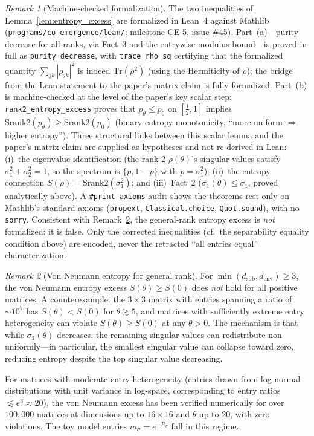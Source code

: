 \documentclass[12pt,a4paper]{article}
\theoremstyle{definition}
\theoremstyle{remark}
\newtheorem{remark}{Remark}
\begin{document}
\begin{remark}[Machine-checked formalization]
\label{rem:lean_entropy_excess}
The two inequalities of Lemma~\ref{lem:entropy_excess} are formalized in
Lean~4 against Mathlib (\texttt{programs/co-emergence/lean/}; milestone
CE-5, issue \#45). Part~(a)---purity decrease for all ranks, via Fact~3
and the entrywise modulus bound---is proved in full as
\texttt{purity\_decrease}, with \texttt{trace\_rho\_sq} certifying that
the formalized quantity $\sum_{jk}|\rho_{jk}|^2$ is indeed
$\mathrm{Tr}(\rho^2)$ (using the Hermiticity of $\rho$); the bridge from
the Lean statement to the paper's matrix claim is fully formalized.
Part~(b) is machine-checked at the level of the paper's key scalar step:
\texttt{rank2\_entropy\_excess} proves that $p_\theta \le p_0$ on
$[\tfrac{1}{2},1]$ implies $\mathrm{Srank2}(p_\theta) \ge
\mathrm{Srank2}(p_0)$ (binary-entropy monotonicity, ``more uniform
$\Rightarrow$ higher entropy''). Three structural links between this
scalar lemma and the paper's matrix claim are supplied as hypotheses
and not re-derived in Lean: (i)~the eigenvalue identification (the
rank-2 $\rho(\theta)$'s singular values satisfy $\sigma_1^2+\sigma_2^2=1$,
so the spectrum is $\{p,1-p\}$ with $p=\sigma_1^2$); (ii)~the entropy
connection $S(\rho)=\mathrm{Srank2}(\sigma_1^2)$; and (iii)~Fact~2
($\sigma_1(\theta)\le\sigma_1$, proved analytically above). A
\texttt{\#print axioms} audit shows the theorems rest only on Mathlib's
standard axioms (\texttt{propext}, \texttt{Classical.choice},
\texttt{Quot.sound}), with no \texttt{sorry}. Consistent with
Remark~\ref{rem:vn_general_rank}, the general-rank entropy excess is
\emph{not} formalized: it is false. Only the corrected inequalities
(cf.\ the separability equality condition above) are encoded, never the
retracted ``all entries equal'' characterization.
\end{remark}

\begin{remark}[Von Neumann entropy for general rank]
\label{rem:vn_general_rank}
For $\min(d_{\mathrm{sub}}, d_{\mathrm{env}}) \geq 3$, the von Neumann
entropy excess $S(\theta) \geq S(0)$ does \emph{not} hold for all
positive matrices. A counterexample: the $3 \times 3$ matrix with
entries spanning a ratio of $\sim\!10^7$ has $S(\theta) < S(0)$ for
$\theta \gtrsim 5$, and matrices with sufficiently extreme entry
heterogeneity can violate $S(\theta) \geq S(0)$ at any $\theta > 0$.
The mechanism is that while $\sigma_1(\theta)$ decreases, the remaining
singular values can redistribute non-uniformly---in particular, the
smallest singular value can collapse toward zero, reducing entropy
despite the top singular value decreasing.

For matrices with moderate entry heterogeneity (entries drawn from
log-normal distributions with unit variance in log-space, corresponding
to entry ratios $\lesssim e^3 \approx 20$), the von Neumann excess has
been verified numerically for over $100{,}000$ matrices at dimensions
up to $16 \times 16$ and $\theta$ up to $20$, with zero violations.
The toy model entries $m_\sigma = e^{-R_\sigma}$ fall in this regime.
\end{remark}
\end{document}
